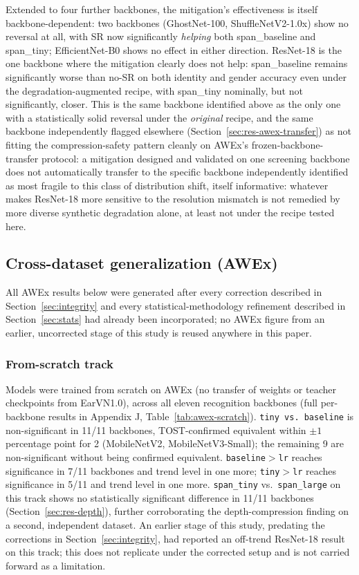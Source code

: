\documentclass[pdflatex,sn-vancouver-num]{sn-jnl}
\begin{document}
Extended to four further backbones, the mitigation's effectiveness is itself backbone-dependent: two backbones (GhostNet-100, ShuffleNetV2-1.0x) show no reversal at all, with SR now significantly \emph{helping} both span\_baseline and span\_tiny; EfficientNet-B0 shows no effect in either direction. ResNet-18 is the one backbone where the mitigation clearly does not help: span\_baseline remains significantly worse than no-SR on both identity and gender accuracy even under the degradation-augmented recipe, with span\_tiny nominally, but not significantly, closer. This is the same backbone identified above as the only one with a statistically solid reversal under the \emph{original} recipe, and the same backbone independently flagged elsewhere (Section~\ref{sec:res-awex-transfer}) as not fitting the compression-safety pattern cleanly on AWEx's frozen-backbone-transfer protocol: a mitigation designed and validated on one screening backbone does not automatically transfer to the specific backbone independently identified as most fragile to this class of distribution shift, itself informative: whatever makes ResNet-18 more sensitive to the resolution mismatch is not remedied by more diverse synthetic degradation alone, at least not under the recipe tested here.

\subsection{Cross-dataset generalization (AWEx)}
\label{sec:res-awex}

All AWEx results below were generated after every correction described in Section~\ref{sec:integrity} and every statistical-methodology refinement described in Section~\ref{sec:stats} had already been incorporated; no AWEx figure from an earlier, uncorrected stage of this study is reused anywhere in this paper.

\subsubsection{From-scratch track}

Models were trained from scratch on AWEx (no transfer of weights or teacher checkpoints from EarVN1.0), across all eleven recognition backbones (full per-backbone results in Appendix J, Table~\ref{tab:awex-scratch}). \texttt{tiny vs.\ baseline} is non-significant in 11/11 backbones, TOST-confirmed equivalent within $\pm 1$ percentage point for 2 (MobileNetV2, MobileNetV3-Small); the remaining 9 are non-significant without being confirmed equivalent. \texttt{baseline}$>$\texttt{lr} reaches significance in 7/11 backbones and trend level in one more; \texttt{tiny}$>$\texttt{lr} reaches significance in 5/11 and trend level in one more. \texttt{span\_tiny} vs.\ \texttt{span\_large} on this track shows no statistically significant difference in 11/11 backbones (Section~\ref{sec:res-depth}), further corroborating the depth-compression finding on a second, independent dataset. An earlier stage of this study, predating the corrections in Section~\ref{sec:integrity}, had reported an off-trend ResNet-18 result on this track; this does not replicate under the corrected setup and is not carried forward as a limitation.
\end{document}
